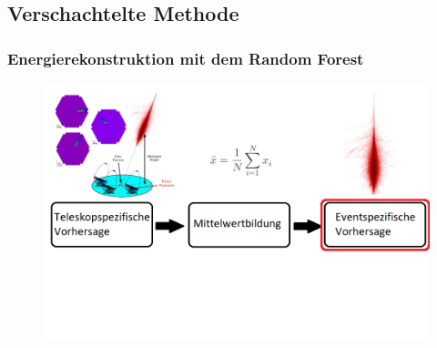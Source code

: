 \documentclass[aspectratio=1610, professionalfonts, 9pt]{beamer}
\begin{document}
  \subsection{Verschachtelte Methode}

  \begin{frame}
    \frametitle{Energierekonstruktion mit dem Random Forest}
    \begin{figure}
      \includegraphics[width=\textwidth]{pictures/Ablauf12.png}
      \caption{}
      \label{}
    \end{figure}
  \end{frame}
\end{document}
